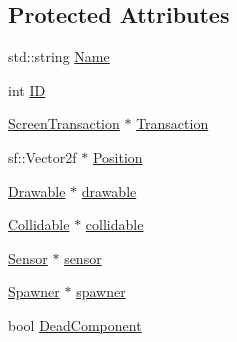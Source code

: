 \subsection*{Protected Attributes}
\begin{DoxyCompactItemize}
\item 
std\-::string \hyperlink{class_game_component_ab1037207fec65ac5fe65dec1e22f0566}{Name}
\item 
int \hyperlink{class_game_component_ac8d794e78280785eb956eaff044f74b2}{I\-D}
\item 
\hyperlink{class_screen_transaction}{Screen\-Transaction} $\ast$ \hyperlink{class_game_component_ae8c59f47f6723d108eb481a160607e98}{Transaction}
\item 
sf\-::\-Vector2f $\ast$ \hyperlink{class_game_component_acc3109bb4ae36112eb8796e067160c59}{Position}
\item 
\hyperlink{class_drawable}{Drawable} $\ast$ \hyperlink{class_game_component_acb73190345f4933825e9c8b8d5030438}{drawable}
\item 
\hyperlink{class_collidable}{Collidable} $\ast$ \hyperlink{class_game_component_aa91bd3600bd5964b55c7806dcfd1c862}{collidable}
\item 
\hyperlink{class_sensor}{Sensor} $\ast$ \hyperlink{class_game_component_ad585bf57df228afc83fbf777142e51bd}{sensor}
\item 
\hyperlink{class_spawner}{Spawner} $\ast$ \hyperlink{class_game_component_a15caaab21ec2e8eb9d438a25afbef4da}{spawner}
\item 
bool \hyperlink{class_game_component_a78058666ddc8662775b13b82e4b615a9}{Dead\-Component}
\end{DoxyCompactItemize}


